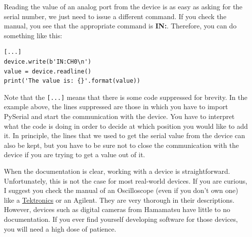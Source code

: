 
Reading the value of an analog port from the device is as easy as asking
for the serial number, we just need to issue a different command. If you
check the manual, you see that the appropriate command is
\textbf{IN:}. Therefore, you can do something like this:

\begin{verbatim}
[...]
device.write(b'IN:CH0\n')
value = device.readline()
print('The value is: {}'.format(value))
\end{verbatim}

Note that the \texttt{[...]} means that there is some code suppressed for brevity. In the example above, the lines suppressed are those in which you have to import PySerial and start the communication with the device. You have to interpret what the code is doing in order to decide at which position you would like to add it. In principle, the lines that we used to get the serial value from the device can also be kept, but you have to be sure not to close the communication with the device if you are trying to get a value out of it.

When the documentation
is clear, working with a device is straightforward. Unfortunately, this is not the case for most real-world
devices. If you are curious, I suggest you check the manual of an
Oscilloscope (even if you don't own one) like a
\href{https://www.tek.com/oscilloscope/tds1000-manual}{Tektronics} or an
Agilent. They are very thorough in their descriptions. However, devices such as digital cameras from Hamamatsu have little to no documentation. If you ever find yourself developing software for those devices, you will need a high dose of patience. 



